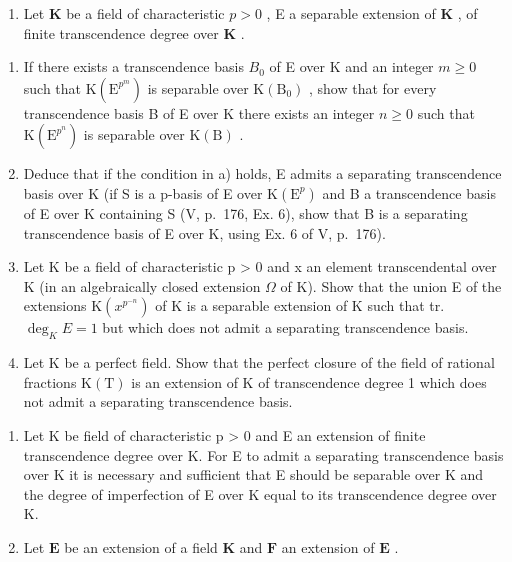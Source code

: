 \BourbakiExerciseGroup

\begin{enumerate}
\def\labelenumi{\arabic{enumi})}
\tightlist
\item
  Let \(\mathbf{K}\) be a field of characteristic \(p > 0\) , E a separable extension of \(\mathbf{K}\) , of finite transcendence degree over \(\mathbf{K}\) .
\end{enumerate}

\begin{enumerate}
\def\labelenumi{\alph{enumi})}
\item
  If there exists a transcendence basis \(B_{0}\) of E over K and an integer \(m \geqslant 0\) such that \(\mathrm{K}(\mathrm{E}^{p^{m}})\) is separable over \(\mathrm{K}(\mathrm{B}_{0})\) , show that for every transcendence basis B of E over K there exists an integer \(n \geqslant 0\) such that \(\mathrm{K}(\mathrm{E}^{p^{n}})\) is separable over \(\mathrm{K}(\mathrm{B})\) .
\item
  Deduce that if the condition in a) holds, E admits a separating transcendence basis over K (if S is a p-basis of E over \(\mathrm{K}(\mathrm{E}^{p})\) and B a transcendence basis of E over K containing S (V, p.~176, Ex. 6), show that B is a separating transcendence basis of E over K, using Ex. 6 of V, p.~176).
\item
  Let K be a field of characteristic p \textgreater{} 0 and x an element transcendental over K (in an algebraically closed extension \(\Omega\) of K). Show that the union E of the extensions \(\mathrm{K}(x^{p^{-n}})\) of K is a separable extension of K such that tr. \(\deg_{K}E = 1\) but which does not admit a separating transcendence basis.
\item
  Let K be a perfect field. Show that the perfect closure of the field of rational fractions \(\mathrm{K}(\mathrm{T})\) is an extension of K of transcendence degree 1 which does not admit a separating transcendence basis.
\end{enumerate}

\begin{enumerate}
\def\labelenumi{\arabic{enumi})}
\setcounter{enumi}{1}
\item
  Let K be field of characteristic p \textgreater{} 0 and E an extension of finite transcendence degree over K. For E to admit a separating transcendence basis over K it is necessary and sufficient that E should be separable over K and the degree of imperfection of E over K equal to its transcendence degree over K.
\item
  Let \(\mathbf{E}\) be an extension of a field \(\mathbf{K}\) and \(\mathbf{F}\) an extension of \(\mathbf{E}\) .
\end{enumerate}


